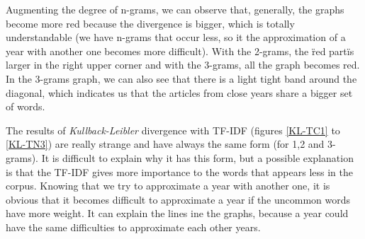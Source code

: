 Augmenting the degree of n-grams, we can observe that, generally, the graphs become more red because the divergence is bigger, which is totally understandable (we have n-grams that occur less, so it the approximation of a year with another one becomes more difficult). With the 2-grams, the \"red part\" is larger in the right upper corner and with the 3-grams, all the graph becomes red. In the 3-grams graph, we can also see that there is a light tight band around the diagonal, which indicates us that the articles from close years share a bigger set of words.

The results of \emph{Kullback-Leibler} divergence with TF-IDF (figures \ref{KL-TC1} to \ref{KL-TN3}) are really strange and have always the same form (for 1,2 and 3-grams). It is difficult to explain why it has this form, but a possible explanation is that the TF-IDF gives more importance to the words that appears less in the corpus. Knowing that we try to approximate a year with another one, it is obvious that it becomes difficult to approximate a year if the uncommon words have more weight. It can explain the lines ine the graphs, because a year could have the same difficulties to approximate each other years.